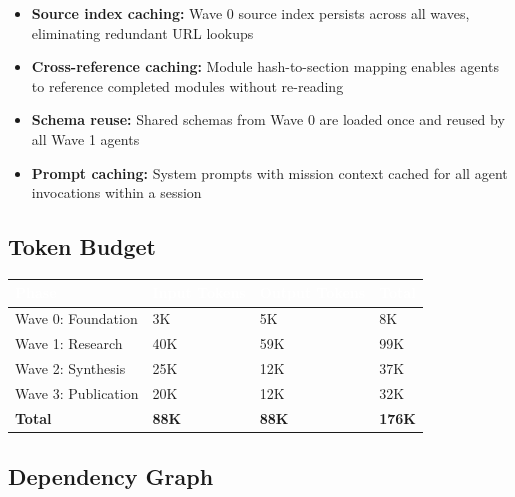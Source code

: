 \documentclass[11pt,letterpaper]{article}
\newcommand{\tableheader}[1]{\textbf{\sffamily\textcolor{white}{#1}}}
\begin{document}
\begin{itemize}[leftmargin=2em]
  \item \textbf{Source index caching:} Wave 0 source index persists across all waves, eliminating redundant URL lookups
  \item \textbf{Cross-reference caching:} Module hash-to-section mapping enables agents to reference completed modules without re-reading
  \item \textbf{Schema reuse:} Shared schemas from Wave 0 are loaded once and reused by all Wave 1 agents
  \item \textbf{Prompt caching:} System prompts with mission context cached for all agent invocations within a session
\end{itemize}

\subsection{Token Budget}

\begin{center}
\begin{tabularx}{\textwidth}{L{4cm}C{2cm}C{2cm}C{2cm}}
\toprule
{}
\tableheader{Phase} & \tableheader{Input Tokens} & \tableheader{Output Tokens} & \tableheader{Total} \\
\midrule
Wave 0: Foundation & 3K & 5K & 8K \\
Wave 1: Research & 40K & 59K & 99K \\
Wave 2: Synthesis & 25K & 12K & 37K \\
Wave 3: Publication & 20K & 12K & 32K \\
\midrule
\textbf{Total} & \textbf{88K} & \textbf{88K} & \textbf{176K} \\
\bottomrule
\end{tabularx}
\end{center}

\subsection{Dependency Graph}
\end{document}
